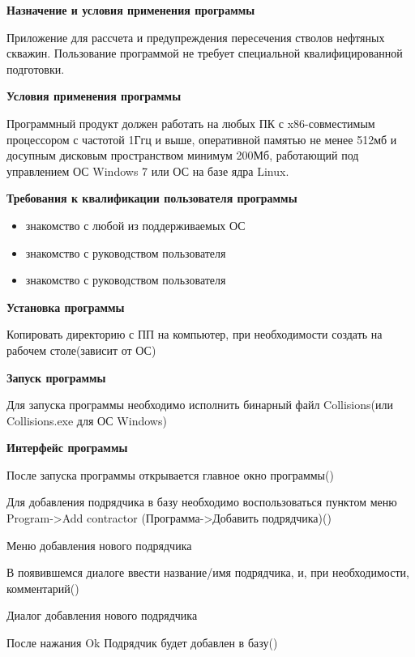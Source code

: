 \textbf{Назначение и условия применения программы}

Приложение для рассчета и предупреждения пересечения стволов нефтяных скважин.
Пользование программой не требует специальной квалифицированной  подготовки.

\textbf{Условия применения программы}

Программный продукт должен работать на любых ПК с x86-совместимым процессором с частотой 1Ггц и выше,
оперативной памятью не менее 512мб и досупным дисковым пространством минимум 200Мб, работающий под
управлением ОС Windows 7 или ОС на базе ядра Linux.

\textbf{Требования к квалификации пользователя программы}

\begin{itemize}
  \item{знакомство с любой из поддерживаемых ОС}
  \item{знакомство с руководством пользователя}
  \item{знакомство с руководством пользователя}
\end{itemize}

\textbf{Установка программы}

Копировать директорию с ПП на компьютер, при необходимости создать на рабочем столе(зависит от ОС)

\textbf{Запуск программы}

Для запуска программы необходимо исполнить бинарный файл Collisions(или Collisions.exe для ОС Windows)

\textbf{Интерфейс программы}

После запуска программы открывается главное окно программы()


Для добавления подрядчика в базу необходимо воспользоваться пунктом меню Program->Add contractor
(Программа->Добавить подрядчика)()

{Меню добавления нового подрядчика}

В появившемся диалоге ввести название/имя подрядчика, и, при необходимости, комментарий()

{Диалог добавления нового подрядчика}

После нажания Ok Подрядчик будет добавлен в базу()

